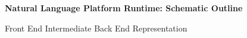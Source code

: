 \begin{frame}{\Huge{\textbf{Natural Language Platform Runtime: Schematic Outline}}}
{\begin{quadblock}{Front End \raisebox{1pt}{\Large $\rightarrow$} 
 Intermediate \raisebox{1pt}{\Large $\rightarrow$} Back End Representation}
{\begin{minipage}{\textwidth}
\begin{figure}
{{\begin{minipage}{\textwidth}
{{{\begin{tikzpicture}
 


\end{tikzpicture}}}
}\end{minipage}}}	
\caption{\colorbox[rgb]{0.98,0.94,0.94}{{}}}\label{fig:CQLStack}
\end{figure}


\end{minipage}}

\end{quadblock}
}

\end{frame}

